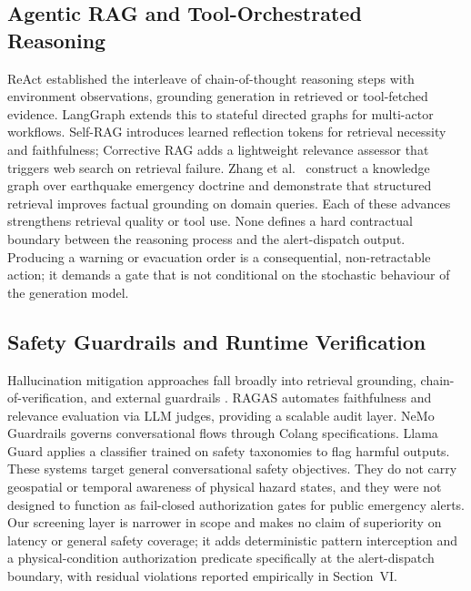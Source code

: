 \documentclass[conference]{IEEEtran}
\begin{document}
\subsection{Agentic RAG and Tool-Orchestrated Reasoning}
ReAct \cite{react} established the interleave of chain-of-thought reasoning steps with environment observations, grounding generation in retrieved or tool-fetched evidence. LangGraph \cite{langgraph} extends this to stateful directed graphs for multi-actor workflows. Self-RAG \cite{selfrag} introduces learned reflection tokens for retrieval necessity and faithfulness; Corrective RAG \cite{crag} adds a lightweight relevance assessor that triggers web search on retrieval failure. Zhang et al.\ \cite{zhang2024} construct a knowledge graph over earthquake emergency doctrine and demonstrate that structured retrieval improves factual grounding on domain queries. Each of these advances strengthens retrieval quality or tool use. None defines a hard contractual boundary between the reasoning process and the alert-dispatch output. Producing a warning or evacuation order is a consequential, non-retractable action; it demands a gate that is not conditional on the stochastic behaviour of the generation model.

\subsection{Safety Guardrails and Runtime Verification}
Hallucination mitigation approaches fall broadly into retrieval grounding, chain-of-verification, and external guardrails \cite{ji,yu2024}. RAGAS \cite{ragas} automates faithfulness and relevance evaluation via LLM judges, providing a scalable audit layer. NeMo Guardrails \cite{nemoguardrails} governs conversational flows through Colang specifications. Llama Guard \cite{inan2023} applies a classifier trained on safety taxonomies to flag harmful outputs. These systems target general conversational safety objectives. They do not carry geospatial or temporal awareness of physical hazard states, and they were not designed to function as fail-closed authorization gates for public emergency alerts. Our screening layer is narrower in scope and makes no claim of superiority on latency or general safety coverage; it adds deterministic pattern interception and a physical-condition authorization predicate specifically at the alert-dispatch boundary, with residual violations reported empirically in Section~VI.
\end{document}
